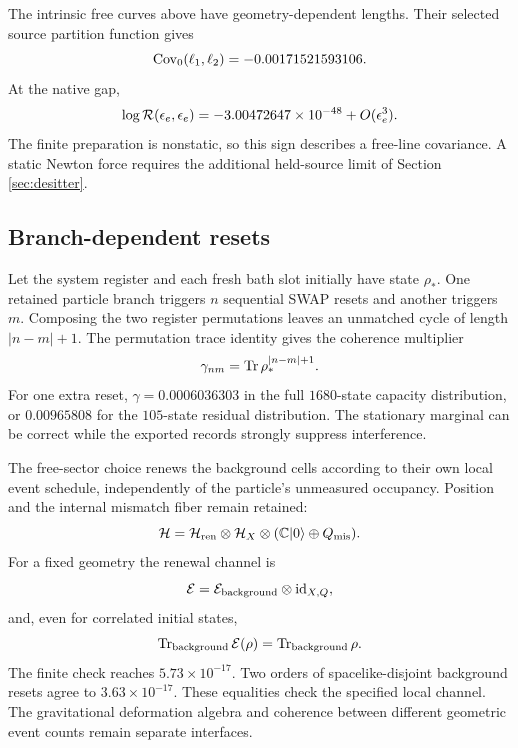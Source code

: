 The intrinsic free curves above have geometry-dependent lengths. Their selected source partition function gives
\begin{equation}
\operatorname{Cov}_0(\ell_1,\ell_2)=-0.00171521593106.
\end{equation}
At the native gap,
\begin{equation}
\log\mathcal R(\epsilon_e,\epsilon_e)
=-3.00472647\times10^{-48}+O(\epsilon_e^3).
\end{equation}
The finite preparation is nonstatic, so this sign describes a free-line covariance. A static Newton force requires the additional held-source limit of Section \ref{sec:desitter}.

\subsection{Branch-dependent resets}

Let the system register and each fresh bath slot initially have state $\rho_*$. One retained particle branch triggers $n$ sequential SWAP resets and another triggers $m$. Composing the two register permutations leaves an unmatched cycle of length $|n-m|+1$. The permutation trace identity gives the coherence multiplier
\begin{equation}
\gamma_{nm}=\operatorname{Tr}\rho_*^{|n-m|+1}.
\label{eq:resetoverlap}
\end{equation}
For one extra reset, $\gamma=0.0006036303$ in the full $1680$-state capacity distribution, or $0.00965808$ for the $105$-state residual distribution. The stationary marginal can be correct while the exported records strongly suppress interference.

The free-sector choice renews the background cells according to their own local event schedule, independently of the particle's unmeasured occupancy. Position and the internal mismatch fiber remain retained:
\begin{equation}
\mathcal H=\mathcal H_{\rm ren}\otimes\mathcal H_X
\otimes(\mathbb C|0\rangle\oplus Q_{\rm mis}).
\end{equation}
For a fixed geometry the renewal channel is
\begin{equation}
\mathcal E=\mathcal E_{\rm background}\otimes\operatorname{id}_{X,Q},
\end{equation}
and, even for correlated initial states,
\begin{equation}
\operatorname{Tr}_{\rm background}\mathcal E(\rho)
=\operatorname{Tr}_{\rm background}\rho.
\end{equation}
The finite check reaches $5.73\times10^{-17}$. Two orders of spacelike-disjoint background resets agree to $3.63\times10^{-17}$. These equalities check the specified local channel. The gravitational deformation algebra and coherence between different geometric event counts remain separate interfaces.

